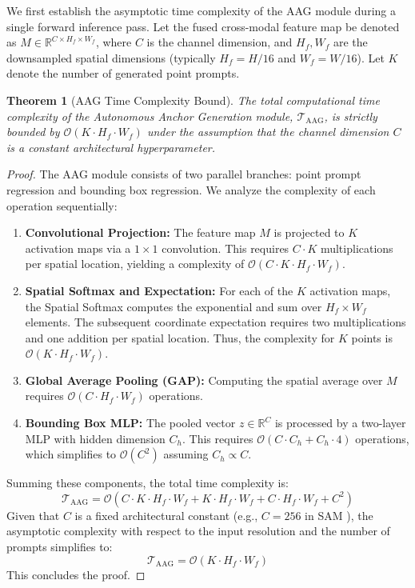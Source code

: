 \documentclass[onecolumn]{IEEEtran}
\numberwithin{equation}{section}
\newtheorem{theorem}{Theorem}[section]
\theoremstyle{definition}
\theoremstyle{remark}
\begin{document}
We first establish the asymptotic time complexity of the AAG module during a single forward inference pass. Let the fused cross-modal feature map be denoted as $M \in \mathbb{R}^{C \times H_f \times W_f}$, where $C$ is the channel dimension, and $H_f, W_f$ are the downsampled spatial dimensions (typically $H_f = H/16$ and $W_f = W/16$). Let $K$ denote the number of generated point prompts.

\begin{theorem}[AAG Time Complexity Bound]
\label{thm:aag_time_complexity}
The total computational time complexity of the Autonomous Anchor Generation module, $\mathcal{T}_{\text{AAG}}$, is strictly bounded by $\mathcal{O}(K \cdot H_f \cdot W_f)$ under the assumption that the channel dimension $C$ is a constant architectural hyperparameter.
\end{theorem}

\begin{proof}
The AAG module consists of two parallel branches: point prompt regression and bounding box regression. We analyze the complexity of each operation sequentially:
\begin{enumerate}
    \item \textbf{Convolutional Projection:} The feature map $M$ is projected to $K$ activation maps via a $1 \times 1$ convolution. This requires $C \cdot K$ multiplications per spatial location, yielding a complexity of $\mathcal{O}(C \cdot K \cdot H_f \cdot W_f)$.
    \item \textbf{Spatial Softmax and Expectation:} For each of the $K$ activation maps, the Spatial Softmax computes the exponential and sum over $H_f \times W_f$ elements. The subsequent coordinate expectation requires two multiplications and one addition per spatial location. Thus, the complexity for $K$ points is $\mathcal{O}(K \cdot H_f \cdot W_f)$.
    \item \textbf{Global Average Pooling (GAP):} Computing the spatial average over $M$ requires $\mathcal{O}(C \cdot H_f \cdot W_f)$ operations.
    \item \textbf{Bounding Box MLP:} The pooled vector $z \in \mathbb{R}^C$ is processed by a two-layer MLP with hidden dimension $C_h$. This requires $\mathcal{O}(C \cdot C_h + C_h \cdot 4)$ operations, which simplifies to $\mathcal{O}(C^2)$ assuming $C_h \propto C$.
\end{enumerate}
Summing these components, the total time complexity is:
\begin{equation}
    \mathcal{T}_{\text{AAG}} = \mathcal{O}(C \cdot K \cdot H_f \cdot W_f + K \cdot H_f \cdot W_f + C \cdot H_f \cdot W_f + C^2)
\end{equation}
Given that $C$ is a fixed architectural constant (e.g., $C=256$ in SAM \cite{kirillov2023segment}), the asymptotic complexity with respect to the input resolution and the number of prompts simplifies to:
\begin{equation}
    \mathcal{T}_{\text{AAG}} = \mathcal{O}(K \cdot H_f \cdot W_f)
\end{equation}
This concludes the proof.
\end{proof}
\end{document}
